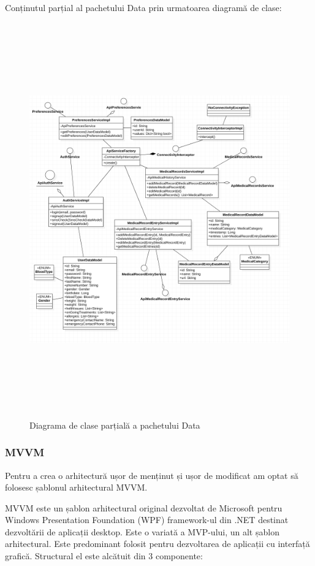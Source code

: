 \documentclass[12pt]{article}
\begin{document}
Conținutul parțial al pachetului Data prin urmatoarea diagramă de clase:


\begin{figure}[H]
    \centering
    \includegraphics[width=15cm,height=17cm]{dataclase.png}
    \caption{Diagrama de clase parțială a pachetului Data}
    \end{figure}

\subsubsection{MVVM}

Pentru a crea o arhitectură ușor de menținut și ușor de modificat am optat să folosesc
șablonul arhitectural MVVM.

MVVM este un șablon arhitectural original dezvoltat de Microsoft pentru Windows Presentation Foundation (WPF) framework-ul
din .NET destinat dezvoltării de aplicații desktop. Este o variată a MVP-ului, un alt șablon arhitectural.
Este predominant folosit pentru dezvoltarea de aplicații cu interfață grafică. Structural el este alcătuit din 3 componente:
\end{document}
